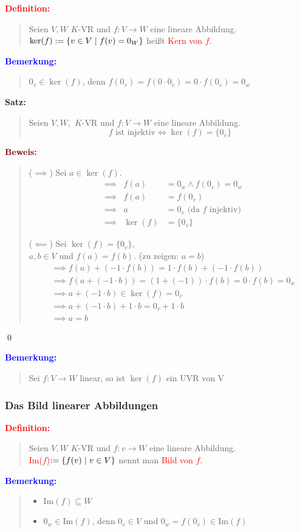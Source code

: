 \documentclass{article}
\newcommand{\smsp}{\phantom{\hspace{3px}}}
\newcommand{\red}[1]{\textcolor{red}{#1}}
\newcommand{\blue}[1]{\textcolor{blue}{#1}}
\newcommand{\dgr}[1]{\textcolor{dgr}{#1}}
\newcommand{\maroon}[1]{\textcolor{maroon}{#1}}
\newcommand{\de}[1]{\red{\textbf{Definition: }}\begin{quote}#1\end{quote}}
\newcommand{\an}[1]{\blue{\textbf{Bemerkung: }}\begin{quote}#1\end{quote}}
\newcommand{\se}[1]{\dgr{\textbf{Satz: }}\begin{quote}#1\end{quote}}
\newcommand{\pr}[1]{\maroon{\textbf{Beweis: }}\begin{quote}#1\end{quote}\qed}
\renewcommand{\st}{\smsp | \smsp}
\newcommand{\im}{\text{Im}}
\begin{document}
\de{
    Seien $V,W$ $K$-VR und $f: V \to W$ eine lineare Abbildung.\\
    $\ker(f) := \{v \in V \st f(v) = 0_W\}$ heißt \red{Kern von $f$}.
}

\an{
    $0_v \in \ker(f)$, denn $f(0_v) = f(0 \cdot 0_v) = 0 \cdot f(0_v) = 0_w$
}

\se{
    Seien $V,W,$ $K$-VR und $f: V \to W$ eine lineare Abbildung.
    $$f \text{ ist injektiv} \iff \ker(f) = \{0_v\}$$
}

\pr{
    ($\implies$) Sei $a \in \ker(f)$.
    \begin{align*}
        &\implies& f(a) &= 0_w \land f(0_v) = 0_w\\
        &\implies& f(a) &= f(0_v)\\
        &\implies& a &= 0_v \text{ (da $f$ injektiv)}\\
        &\implies& \ker(f) &= \{0_v\}
    \end{align*}

    ($\impliedby$) Sei $\ker(f) = \{0_v\}$,\\
    $a,b \in V$ und $f(a) = f(b)$. (zu zeigen: $a = b$)
    \begin{align*}
        &\implies f(a) + (-1 \cdot f(b)) = 1 \cdot f(b) + (-1 \cdot f(b))\\
        &\implies f(a + (-1 \cdot b)) = (1 + (-1)) \cdot f(b) = 0 \cdot f(b) = 0_w\\
        &\implies a + (-1 \cdot b) \in \ker(f) = 0_v\\
        &\implies a + (-1 \cdot b) + 1 \cdot b = 0_v + 1 \cdot b\\
        &\implies a = b 
    \end{align*}
}

\an{
    Sei $f: V \to W$ linear, so ist $\ker(f)$ ein UVR von V
}

\subsubsection{Das Bild linearer Abbildungen}
\de{
    Seien $V,W$ $K$-VR und $f: v \to W$ eine lineare Abbildung.\\
    \red{Im($f$)}$ := \{f(v) \st v \in V\}$ nennt man \red{Bild von $f$}.
}

\an{
    \begin{itemize}
        \item $\im(f) \subseteq W$
        \item $0_w \in \im(f)$, denn $0_v \in V$ und $0_w = f(0_v) \in \im(f)$
    \end{itemize}
}
\end{document}

